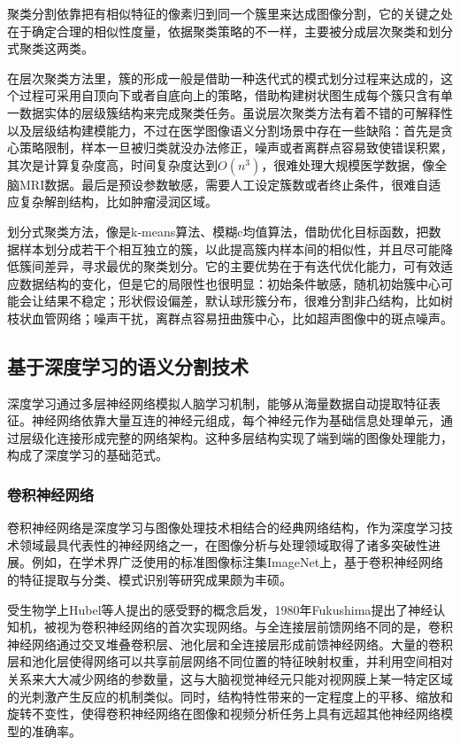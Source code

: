 聚类分割依靠把有相似特征的像素归到同一个簇里来达成图像分割，它的关键之处在于确定合理的相似性度量，依据聚类策略的不一样，主要被分成层次聚类和划分式聚类这两类。

在层次聚类方法里，簇的形成一般是借助一种迭代式的模式划分过程来达成的，这个过程可采用自顶向下或者自底向上的策略，借助构建树状图生成每个簇只含有单一数据实体的层级簇结构来完成聚类任务。虽说层次聚类方法有着不错的可解释性以及层级结构建模能力，不过在医学图像语义分割场景中存在一些缺陷：首先是贪心策略限制，样本一旦被归类就没办法修正，噪声或者离群点容易致使错误积累，其次是计算复杂度高，时间复杂度达到$O(n^3)$，很难处理大规模医学数据，像全脑MRI数据。最后是预设参数敏感，需要人工设定簇数或者终止条件，很难自适应复杂解剖结构，比如肿瘤浸润区域。

划分式聚类方法，像是k-means算法、模糊c均值算法，借助优化目标函数，把数据样本划分成若干个相互独立的簇，以此提高簇内样本间的相似性，并且尽可能降低簇间差异，寻求最优的聚类划分。它的主要优势在于有迭代优化能力，可有效适应数据结构的变化，但是它的局限性也很明显：初始条件敏感，随机初始簇中心可能会让结果不稳定；形状假设偏差，默认球形簇分布，很难分割非凸结构，比如树枝状血管网络；噪声干扰，离群点容易扭曲簇中心，比如超声图像中的斑点噪声。

\subsection{基于深度学习的语义分割技术}

深度学习通过多层神经网络模拟人脑学习机制，能够从海量数据自动提取特征表征。神经网络依靠大量互连的神经元组成，每个神经元作为基础信息处理单元，通过层级化连接形成完整的网络架构\cite{qiu2020nndl}。这种多层结构实现了端到端的图像处理能力，构成了深度学习的基础范式。

\subsubsection{卷积神经网络}

卷积神经网络是深度学习与图像处理技术相结合的经典网络结构，作为深度学习技术领域最具代表性的神经网络之一，在图像分析与处理领域取得了诸多突破性进展。例如，在学术界广泛使用的标准图像标注集ImageNet上，基于卷积神经网络的特征提取与分类、模式识别等研究成果颇为丰硕。

受生物学上Hubel等人\cite{hubel1962}提出的感受野的概念启发，1980年Fukushima\cite{fukushima1980}提出了神经认知机，被视为卷积神经网络的首次实现网络。与全连接层前馈网络不同的是，卷积神经网络通过交叉堆叠卷积层、池化层和全连接层形成前馈神经网络。大量的卷积层和池化层使得网络可以共享前层网络不同位置的特征映射权重，并利用空间相对关系来大大减少网络的参数量，这与大脑视觉神经元只能对视网膜上某一特定区域的光刺激产生反应的机制类似。同时，结构特性带来的一定程度上的平移、缩放和旋转不变性，使得卷积神经网络在图像和视频分析任务上具有远超其他神经网络模型的准确率。

